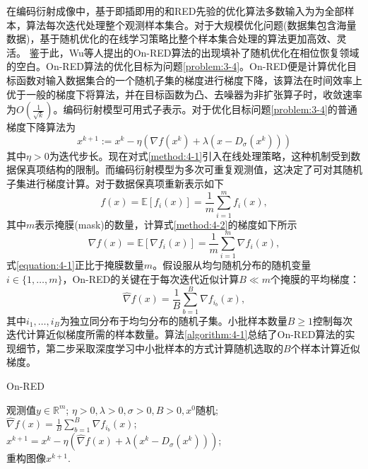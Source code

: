 在编码衍射成像中，基于即插即用的和RED先验的优化算法多数输入为为全部样本，算法每次迭代处理整个观测样本集合。对于大规模优化问题(数据集包含海量数据)，基于随机优化的在线学习策略比整个样本集合处理的算法更加高效、灵活。%
鉴于此，Wu等人提出的On-RED算法的出现填补了随机优化在相位恢复领域的空白\supercite{Zihui}。On-RED算法的优化目标为问题\eqref{problem:3-4}。On-RED便是计算优化目标函数对输入数据集合的一个随机子集的梯度进行梯度下降，该算法在时间效率上优于一般的梯度下将算法\supercite{Zihui,Hong}，并在目标函数为凸、去噪器为非扩张算子时，收敛速率为$O(\frac{1}{\sqrt{k}})$。编码衍射模型可用式子表示。对于优化目标问题\eqref{problem:3-4}的普通梯度下降算法为
\begin{equation} \label{method:4-1}
	x^{k+1}:=x^k-\eta(\nabla{f(x^k)}+\lambda{(x-D_{\sigma}(x^k))})
\end{equation}
其中$\eta>0$为迭代步长。现在对式\eqref{method:4-1}引入在线处理策略，这种机制受到数据保真项结构的限制。而编码衍射模型为多次可重复观测值，这决定了可对其随机子集进行梯度计算。对于数据保真项重新表示如下
\begin{equation} \label{method:4-2}
	f(x)=\mathbb{E}[f_i(x)]=\frac{1}{m}\sum_{i=1}^{m}f_i(x),
\end{equation}
其中$m$表示掩膜(mask)的数量，计算式\eqref{method:4-2}的梯度如下所示
\begin{equation} \label{equation:4-1}
	\nabla{f(x)}=\mathbb{E}[\nabla{f_i(x)}]=\frac{1}{m}\sum_{i=1}^{m}\nabla{f_i(x)},
\end{equation}
式\eqref{equation:4-1}正比于掩膜数量$m$。假设服从均匀随机分布的随机变量$i\in\{1,\ldots,m\}$，On-RED的关键在于每次迭代近似计算$B\ll{m}$个掩膜的平均梯度：
\begin{equation} \label{equation:4-2}
	\hat{\nabla}f(x)=\frac{1}{B}\sum_{b=1}^{B}\nabla{f_{i_{b}}(x)},
\end{equation}
其中$i_1,\ldots,i_B$为独立同分布于均匀分布的随机子集。小批样本数量$B\geq{1}$控制每次迭代计算近似梯度所需的样本数量。算法\ref{algorithm:4-1}总结了On-RED算法的实现细节，第二步采取深度学习中小批样本的方式计算随机选取的$B$个样本计算近似梯度。
\begin{algorithm}[!htbp]
	\caption{On-RED}
	\label{algorithm:4-1}
	\begin{algorithmic}[1]
		\REQUIRE	观测值$y\in \mathbb{R}^m$; %
		\ENSURE		%
		$\eta>0, \lambda>0, \sigma>0, B>0, x^0$随机; \\
		\STATE	$\hat{\nabla}f(x)=\frac{1}{B}\sum_{b=1}^{B}\nabla{f_{i_{b}}(x)}$; \\  %
		\STATE	$x^{k+1}=x^k-\eta{(\hat{\nabla}f(x) + \lambda(x^k-D_{\sigma}(x^k)))}$; \\	%
		\ENDWHILE
		\RETURN 重构图像$x^{k+1}$.  %
	\end{algorithmic}
\end{algorithm}
